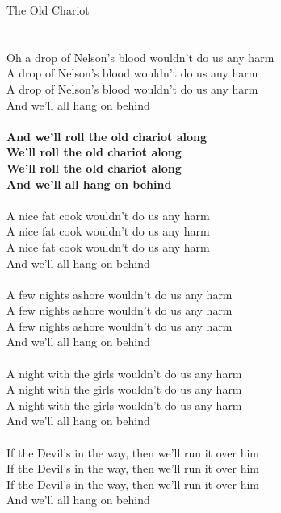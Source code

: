 \documentclass[letterpaper,9pt]{article}
\begin{document}
\newpage
{}
\huge
The Old Chariot\\
\\
\Large
\\Oh a drop of Nelson's blood wouldn't do us any harm
\\A drop of Nelson's blood wouldn't do us any harm
\\A drop of Nelson's blood wouldn't do us any harm
\\And we'll all hang on behind
\\
\\\textbf{And we'll roll the old chariot along
\\We'll roll the old chariot along
\\We'll roll the old chariot along
\\And we'll all hang on behind}
\\
\\A nice fat cook wouldn't do us any harm
\\A nice fat cook wouldn't do us any harm
\\A nice fat cook wouldn't do us any harm
\\And we'll all hang on behind
\\
\\A few nights ashore wouldn't do us any harm
\\A few nights ashore wouldn't do us any harm
\\A few nights ashore wouldn't do us any harm
\\And we'll all hang on behind
\\
\\A night with the girls wouldn't do us any harm
\\A night with the girls wouldn't do us any harm
\\A night with the girls wouldn't do us any harm
\\And we'll all hang on behind
\\
\\If the Devil's in the way, then we'll run it over him
\\If the Devil's in the way, then we'll run it over him
\\If the Devil's in the way, then we'll run it over him
\\And we'll all hang on behind
\end{document}
